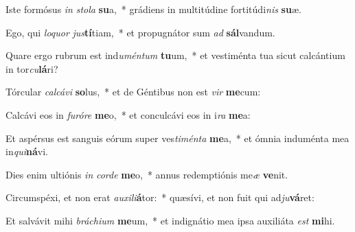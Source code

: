 \item Iste formósus \textit{in} \textit{sto}\textit{la} \textbf{su}a,~* grádiens in multitúdine fortitúdi\textit{nis} \textbf{su}æ.
\item Ego, qui \textit{lo}\textit{quor} \textit{jus}\textbf{tí}tiam,~* et propugnátor sum \textit{ad} \textbf{sál}vandum.
\item Quare ergo rubrum est ind\textit{u}\textit{mén}\textit{tum} \textbf{tu}um,~* et vestiménta tua sicut calcántium in tor\textit{cu}\textbf{lá}ri?
\item Tórcular \textit{cal}\textit{cá}\textit{vi} \textbf{so}lus,~* et de Géntibus non est \textit{vir} \textbf{me}cum:
\item Calcávi eos in \textit{fu}\textit{ró}\textit{re} \textbf{me}o,~* et conculcávi eos in i\textit{ra} \textbf{me}a:
\item Et aspérsus est sanguis eórum super ves\textit{ti}\textit{mén}\textit{ta} \textbf{me}a,~* et ómnia induménta mea in\textit{qui}\textbf{ná}vi.
\item Dies enim ultiónis \textit{in} \textit{cor}\textit{de} \textbf{me}o,~* annus redemptiónis me\textit{æ} \textbf{ve}nit.
\item Circumspéxi, et non erat \textit{au}\textit{xi}\textit{li}\textbf{á}tor:~* quæsívi, et non fuit qui ad\textit{ju}\textbf{vá}ret:
\item Et salvávit mihi \textit{brá}\textit{chi}\textit{um} \textbf{me}um,~* et indignátio mea ipsa auxiliáta \textit{est} \textbf{mi}hi.
